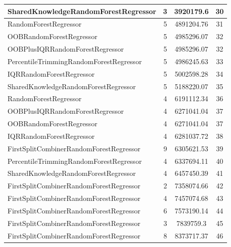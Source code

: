 \begin{table}[h]
\centering
\begin{tabular}{|l|c|c|c|}
\hline
\textcolor[HTML]{ef9b20}{SharedKnowledgeRandomForestRegressor} & 3 & 3920179.6 & 30 \\ \hline
\textcolor[HTML]{87bc45}{RandomForestRegressor} & 5 & 4891204.76 & 31 \\ \hline
\textcolor[HTML]{b33dc6}{OOBRandomForestRegressor} & 5 & 4985296.07 & 32 \\ \hline
\textcolor[HTML]{ede15b}{OOBPlusIQRRandomForestRegressor} & 5 & 4985296.07 & 32 \\ \hline
\textcolor[HTML]{f46a9b}{PercentileTrimmingRandomForestRegressor} & 5 & 4986245.63 & 33 \\ \hline
\textcolor[HTML]{27aeef}{IQRRandomForestRegressor} & 5 & 5002598.28 & 34 \\ \hline
\textcolor[HTML]{ef9b20}{SharedKnowledgeRandomForestRegressor} & 5 & 5188220.07 & 35 \\ \hline
\textcolor[HTML]{87bc45}{RandomForestRegressor} & 4 & 6191112.34 & 36 \\ \hline
\textcolor[HTML]{ede15b}{OOBPlusIQRRandomForestRegressor} & 4 & 6271041.04 & 37 \\ \hline
\textcolor[HTML]{b33dc6}{OOBRandomForestRegressor} & 4 & 6271041.04 & 37 \\ \hline
\textcolor[HTML]{27aeef}{IQRRandomForestRegressor} & 4 & 6281037.72 & 38 \\ \hline
\textcolor[HTML]{ea5545}{FirstSplitCombinerRandomForestRegressor} & 9 & 6305621.53 & 39 \\ \hline
\textcolor[HTML]{f46a9b}{PercentileTrimmingRandomForestRegressor} & 4 & 6337694.11 & 40 \\ \hline
\textcolor[HTML]{ef9b20}{SharedKnowledgeRandomForestRegressor} & 4 & 6457450.39 & 41 \\ \hline
\textcolor[HTML]{ea5545}{FirstSplitCombinerRandomForestRegressor} & 2 & 7358074.66 & 42 \\ \hline
\textcolor[HTML]{ea5545}{FirstSplitCombinerRandomForestRegressor} & 4 & 7457074.68 & 43 \\ \hline
\textcolor[HTML]{ea5545}{FirstSplitCombinerRandomForestRegressor} & 6 & 7573190.14 & 44 \\ \hline
\textcolor[HTML]{ea5545}{FirstSplitCombinerRandomForestRegressor} & 3 & 7839759.3 & 45 \\ \hline
\textcolor[HTML]{ea5545}{FirstSplitCombinerRandomForestRegressor} & 8 & 8373717.37 & 46 \\ \hline

\end{tabular}
\end{table}
